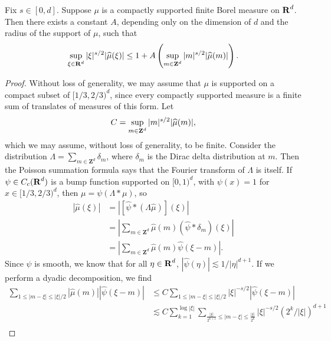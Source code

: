 \begin{lemma} \label{discretefouriermeasures}
    Fix $s \in [0,d]$. Suppose $\mu$ is a compactly supported finite Borel measure on $\operatorname{\mathbf{R}}^d$. Then there exists a constant $A$, depending only on the dimension of $d$ and the radius of the support of $\mu$, such that
    \[ \sup_{\xi \in \operatorname{\mathbf{R}}^d} |\xi|^{s/2} |\widehat{\mu}(\xi)| \leq 1 + A \left( \sup_{m \in \operatorname{\mathbf{Z}}^d} |m|^{s/2} |\widehat{\mu}(m)| \right). \]
\end{lemma}
\begin{proof}
    Without loss of generality, we may assume that $\mu$ is supported on a compact subset of $[1/3,2/3)^d$, since every compactly supported measure is a finite sum of translates of measures of this form. Let
    \[ C = \sup_{m \in \operatorname{\mathbf{Z}}^d} |m|^{s/2} |\widehat{\mu}(m)|, \]
    which we may assume, without loss of generality, to be finite. Consider the distribution $\Lambda = \sum_{m \in \mathbf{Z}^d} \delta_m$, where $\delta_m$ is the Dirac delta distribution at $m$. Then the Poisson summation formula says that the Fourier transform of $\Lambda$ is itself. If $\psi \in C_c(\operatorname{\mathbf{R}}^d)$ is a bump function supported on $[0,1)^d$, with $\psi(x) = 1$ for $x \in [1/3,2/3)^d$, then $\mu = \psi (\Lambda * \mu)$, so
    \begin{equation} \label{mubounded}
    \begin{split}
        |\widehat{\mu}(\xi)| &= \left| \left[ \widehat{\psi} * (\Lambda \widehat{\mu}) \right](\xi) \right|\\
        &= \left| \sum_{m \in \mathbf{Z}^d} \widehat{\mu}(m)(\widehat{\psi} * \delta_m)(\xi) \right|\\
        &= \left| \sum_{m \in \mathbf{Z}^d} \widehat{\mu}(m) \widehat{\psi}(\xi - m) \right|.
    \end{split}
    \end{equation}
    Since $\psi$ is smooth, we know that for all $\eta \in \operatorname{\mathbf{R}}^d$, $|\widehat{\psi}(\eta)| \lesssim 1/|\eta|^{d+1}$. If we perform a dyadic decomposition, we find
    \begin{equation}
        \label{calculation1}
    \begin{split}
        \sum_{1 \leq |m - \xi| \leq |\xi|/2} |\widehat{\mu}(m)| |\widehat{\psi}(\xi - m)| &\leq C \sum_{1 \leq |m - \xi| \leq |\xi|/2} |\xi|^{-s/2} |\widehat{\psi}(\xi - m)|\\
        &\lesssim C \sum_{k = 1}^{\log |\xi|} \sum_{\frac{|\xi|}{2^{k+1}} \leq |m - \xi| \leq \frac{|\xi|}{2^{k}}} |\xi|^{-s/2} \left( 2^k/|\xi| \right)^{d+1}\\

\end{split}
\end{equation}
\end{proof}
